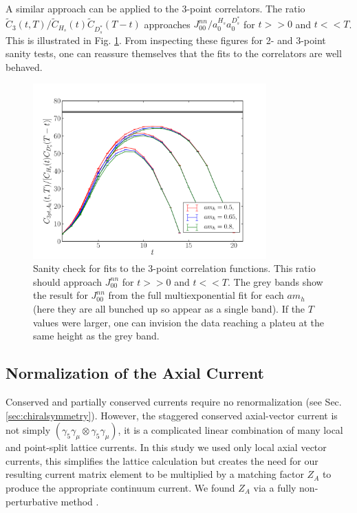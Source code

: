 A similar approach can be applied to the 3-point correlators. The ratio $\tilde{C}_3(t,T)/\tilde{C}_{H_s}(t) \tilde{C}_{D_s^*}(T-t)$ approaches $J_{00}^{nn}/a_0^{H_s}a_0^{D^*_s}$ for $t>>0$ and $t<<T$. This is illustrated in Fig. \ref{eq:3pt-summary_BsDsstar}. From inspecting these figures for 2- and 3-point sanity tests, one can reassure themselves that the fits to the correlators are well behaved.

\begin{figure}[htb!]
  \begin{center}
    \vspace{-10pt}
  \includegraphics[width=0.8\textwidth]{images/BsDsstar/3ptsummary_fine.pdf}
  \caption{Sanity check for fits to the 3-point correlation functions. This ratio should approach $J_{00}^{nn}$ for $t>>0$ and $t<<T$. The grey bands show the result for $J_{00}^{nn}$ from the full multiexponential fit for each $am_h$ (here they are all bunched up so appear as a single band). If the $T$ values were larger, one can invision the data reaching a plateu at the same height as the grey band. \label{eq:3pt-summary_BsDsstar}}
  \end{center}
  \vspace{-10pt}
\end{figure}

\subsection{Normalization of the Axial Current}

Conserved and partially conserved currents require no renormalization (see Sec. \ref{sec:chiralsymmetry}). However, the staggered conserved axial-vector current is not simply $(\gamma_5\gamma_{\mu}\otimes \gamma_5\gamma_{\mu})$, it is a complicated linear combination of many local and point-split lattice currents. In this study we used only local axial vector currents, this simplifies the lattice calculation but creates the need for our resulting current matrix element to be multiplied by a matching factor $Z_A$ to produce the appropriate continuum current. We found $Z_A$ via a fully non-perturbative method \cite{McNeile:2011ng,Donald:2013pea}.

